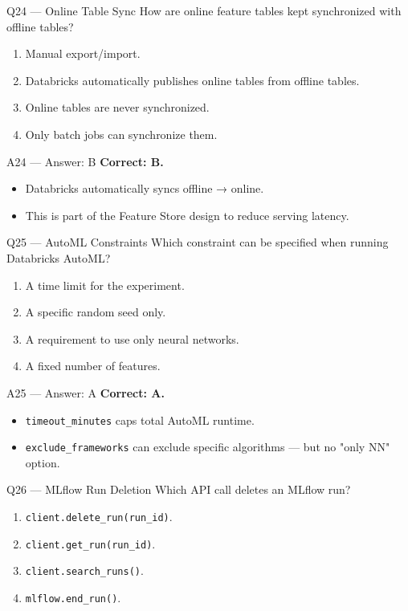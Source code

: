 \documentclass[aspectratio=169,10pt]{beamer}
\begin{document}
	\begin{frame}{Q24 — Online Table Sync}
		How are online feature tables kept synchronized with offline tables?
		\begin{enumerate}[label=\Alph*.]
			\item Manual export/import.
			\item Databricks automatically publishes online tables from offline tables.
			\item Online tables are never synchronized.
			\item Only batch jobs can synchronize them.
		\end{enumerate}
	\end{frame}
	
	\begin{frame}{A24 — Answer: B}
		\textbf{Correct: B.}
		\begin{itemize}
			\item Databricks automatically syncs offline → online.
			\item This is part of the Feature Store design to reduce serving latency.
		\end{itemize}
	\end{frame}
	
	\begin{frame}{Q25 — AutoML Constraints}
		Which constraint can be specified when running Databricks AutoML?
		\begin{enumerate}[label=\Alph*.]
			\item A time limit for the experiment.
			\item A specific random seed only.
			\item A requirement to use only neural networks.
			\item A fixed number of features.
		\end{enumerate}
	\end{frame}
	
	\begin{frame}{A25 — Answer: A}
		\textbf{Correct: A.}
		\begin{itemize}
			\item \texttt{timeout\_minutes} caps total AutoML runtime.
			\item \texttt{exclude\_frameworks} can exclude specific algorithms — but no "only NN" option.
		\end{itemize}
	\end{frame}
	
	\begin{frame}{Q26 — MLflow Run Deletion}
		Which API call deletes an MLflow run?
		\begin{enumerate}[label=\Alph*.]
			\item \texttt{client.delete\_run(run\_id)}.
			\item \texttt{client.get\_run(run\_id)}.
			\item \texttt{client.search\_runs()}.
			\item \texttt{mlflow.end\_run()}.
		\end{enumerate}
	\end{frame}
	
\end{document}
